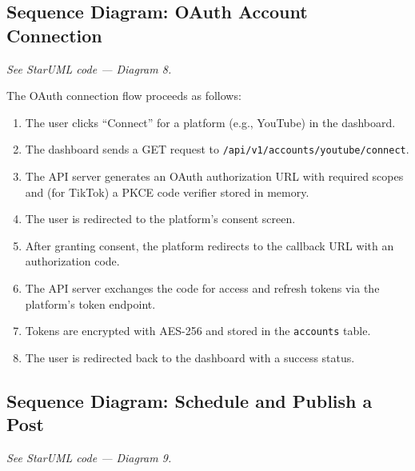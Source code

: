 \subsection{Sequence Diagram: OAuth Account Connection}

\noindent\textit{See StarUML code --- Diagram 8.}


The OAuth connection flow proceeds as follows:
\begin{enumerate}
    \item The user clicks ``Connect'' for a platform (e.g., YouTube) in the dashboard.
    \item The dashboard sends a GET request to \texttt{/api/v1/accounts/youtube/connect}.
    \item The API server generates an OAuth authorization URL with required scopes and (for TikTok) a PKCE code verifier stored in memory.
    \item The user is redirected to the platform's consent screen.
    \item After granting consent, the platform redirects to the callback URL with an authorization code.
    \item The API server exchanges the code for access and refresh tokens via the platform's token endpoint.
    \item Tokens are encrypted with AES-256 and stored in the \texttt{accounts} table.
    \item The user is redirected back to the dashboard with a success status.
\end{enumerate}

\subsection{Sequence Diagram: Schedule and Publish a Post}

\noindent\textit{See StarUML code --- Diagram 9.}


